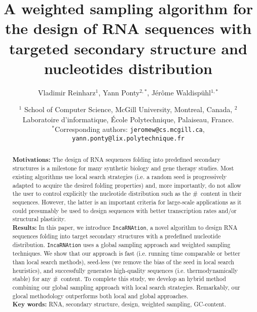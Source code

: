\documentclass[11pt]{article}
\title{A weighted sampling algorithm for the design of RNA sequences with targeted secondary structure and nucleotides distribution}
\author{Vladimir Reinharz$^1$, Yann Ponty$^{2,*}$, J\'er\^{o}me Waldisp\"{u}hl$^{1,*}$}
\date{$^1$ School of Computer Science, McGill University, Montreal, Canada, $^2$ Laboratoire d'informatique, \'Ecole Polytechnique, Palaiseau, France.\\ \small $^*$Corresponding authors: \texttt{jeromew@cs.mcgill.ca}, \texttt{yann.ponty@lix.polytechnique.fr}}
\newcommand{\ourprog}{\texttt{IncaRNAtion}\xspace}
\newcommand{\gc}{{\#\text{{\sf gc}}}}
\begin{document}
\maketitle
\begin{abstract}
\noindent
\textbf{Motivations:} The design of RNA sequences folding into predefined secondary structures is a milestone for many synthetic biology and gene therapy studies. Most existing algorithms use local search strategies (i.e. a random seed is progressively adapted to acquire the desired folding properties) and, more importantly, do not allow the user to control explicitly the nucleotide distribution such as the \gc~content in their sequences. However, the latter is an important criteria for large-scale applications as it could presumably be used to design sequences with better transcription rates and/or structural plasticity.\\
\noindent
\textbf{Results:}
In this paper, we introduce \ourprog, a novel algorithm to design RNA sequences folding into target secondary structures with a predefined nucleotide distribution.  \ourprog uses a global sampling approach and weighted sampling techniques. We show that our approach is fast (i.e. running time comparable or better than local search methods), seed-less (we remove the bias of the seed in local search heuristics), and successfully generates high-quality sequences (i.e. thermodynamically stable) for any \gc~content. To complete this study, we develop an hybrid method combining our global sampling approach with local search strategies. Remarkably, our glocal methodology outperforms both local and global approaches.\\
\noindent
\textbf{Key words:} RNA, secondary structure, design, weighted sampling, GC-content.
\end{abstract}

\newpage











\newpage




\newpage


\end{document}
